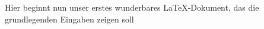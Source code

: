 \documentclass[10pt, a4paper]{article}
\begin{document}
 Hier beginnt nun unser erstes wunderbares LaTeX-Dokument,
 das die grundlegenden Eingaben zeigen soll
 
\end{document}
